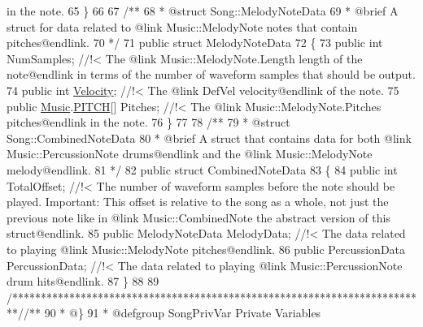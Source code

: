 \begin{DoxyCodeInclude}
{       in the note.}
65 \textcolor{comment}{}    \}
66 \textcolor{comment}{}
67 \textcolor{comment}{    /**}
68 \textcolor{comment}{     * @struct Song::MelodyNoteData}
69 \textcolor{comment}{     * @brief A struct for data related to @link Music::MelodyNote notes that contain pitches@endlink.}
70 \textcolor{comment}{    */}
71     \textcolor{keyword}{public} \textcolor{keyword}{struct }MelodyNoteData
72     \{
73         \textcolor{keyword}{public} \textcolor{keywordtype}{int} NumSamples; \textcolor{comment}{//!< The @link Music::MelodyNote.Length length of the note@endlink in terms
       of the number of waveform samples that should be output. }
74 \textcolor{comment}{}        \textcolor{keyword}{public} \textcolor{keywordtype}{int} \hyperlink{group___song_structs_ad3e20aaef3edeeb78a01522adb218797}{Velocity}; \textcolor{comment}{//!< The @link DefVel velocity@endlink of the note.}
75 \textcolor{comment}{}        \textcolor{keyword}{public} \hyperlink{class_music}{Music}.\hyperlink{group___music_enums_ga508f69b199ea518f935486c990edac1d}{PITCH}[] Pitches; \textcolor{comment}{//!< The @link Music::MelodyNote.Pitches pitches@endlink in
       the note.}
76 \textcolor{comment}{}    \}
77 \textcolor{comment}{}
78 \textcolor{comment}{    /**}
79 \textcolor{comment}{     * @struct Song::CombinedNoteData}
80 \textcolor{comment}{     * @brief A struct that contains data for both @link Music::PercussionNote drums@endlink and the @link
       Music::MelodyNote melody@endlink.}
81 \textcolor{comment}{    */}
82     \textcolor{keyword}{public} \textcolor{keyword}{struct }CombinedNoteData
83     \{
84         \textcolor{keyword}{public} \textcolor{keywordtype}{int} TotalOffset; \textcolor{comment}{//!< The number of waveform samples before the note should be played.
       Important: This offset is relative to the song as a whole, not just the previous note like in @link
       Music::CombinedNote the abstract version of this struct@endlink.}
85 \textcolor{comment}{}        \textcolor{keyword}{public} MelodyNoteData MelodyData; \textcolor{comment}{//!< The data related to playing @link Music::MelodyNote
       pitches@endlink.}
86 \textcolor{comment}{}        \textcolor{keyword}{public} PercussionData PercussionData; \textcolor{comment}{//!< The data related to playing @link Music::PercussionNote
       drum hits@endlink.}
87 \textcolor{comment}{}    \}
88 
89     \textcolor{comment}{/*************************************************************************/}\textcolor{comment}{/** }
90 \textcolor{comment}{     * @\}}
91 \textcolor{comment}{     * @defgroup SongPrivVar Private Variables}

\end{DoxyCodeInclude}
